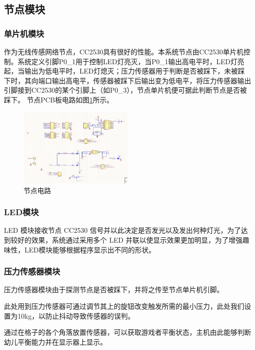 \begin{spacing}{1.2}
\subsection{节点模块}
    \subsubsection{单片机模块}
    作为无线传感网络节点，CC2530具有很好的性能\supercite{15}。本系统节点由CC2530单片机控制。系统定义引脚P0\_1用于控制LED灯亮灭，当P0\_1输出高电平时，LED灯亮起，当输出为低电平时，LED灯熄灭；压力传感器用于判断是否被踩下，未被踩下时，其向端口输出高电平，传感器被踩下后输出变为低电平，将压力传感器输出引脚接到CC2530的某个引脚上（如P0\_3），节点单片机便可据此判断节点是否被踩下。
    节点PCB板电路如图\ref{fig:pcb}所示。

\begin{figure}[htb]
    \centering
    {\includegraphics [width=0.5\textwidth]{./image/pcb2.png}
    \caption{节点电路}
    \label{fig:pcb}}
\end{figure}

    \subsubsection{LED模块}
    LED 模块接收节点 CC2530 信号并以此决定是否发光以及发出何种灯光，为了达到较好的效果，系统通过采用多个 LED 并联以使显示效果更加明显，为了增强趣味性，LED模块能够根据程序显示出不同的形状。

    \subsubsection{压力传感器模块}
    压力传感器模块由于探测节点是否被踩下，并将之传至节点单片机引脚。

    此处用到压力传感器可通过调节其上的旋钮改变触发所需的最小压力，此处我们设置为10kg，以防止抖动导致传感器的误判。

    通过在格子的各个角落放置传感器，可以获取游戏者平衡状态，主机由此能够判断幼儿平衡能力并在显示器上显示。



\end{spacing}
